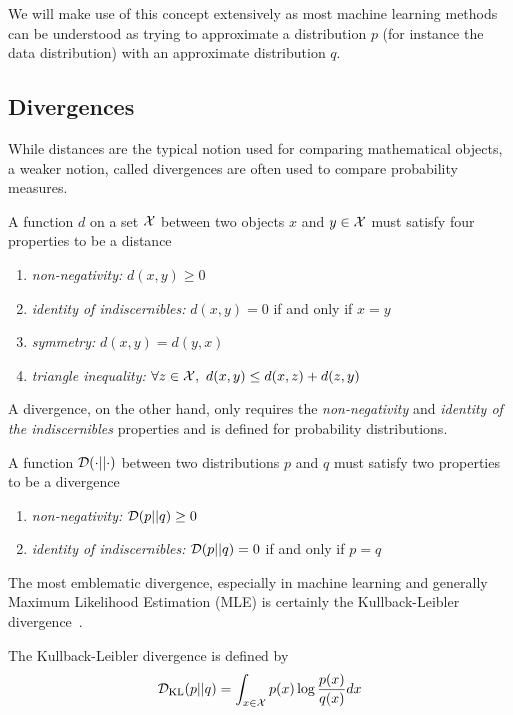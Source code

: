 We will make use of this concept extensively as most machine learning methods can be understood as trying to approximate a distribution $p$ (for instance the data distribution) with an approximate distribution $q$.



\subsection{Divergences}
While distances are the typical notion used for comparing mathematical objects, a weaker notion, called divergences are often used to compare probability measures.



\begin{definition}[Distance]
A function $d$ on a set ${\mathcal{X}}$ between two objects $x$ and $y \in {\mathcal{X}}$ must satisfy four properties to be a distance
\begin{enumerate}
    \item \emph{non-negativity:} $d(x, y) \ge 0$
    \item \emph{identity of indiscernibles:} $d(x,y) = 0$ if and only if $x = y$
    \item \emph{symmetry:} $d(x,y) = d(y,x)$
    \item \emph{triangle inequality:} $\forall z \in {\mathcal{X}}, \ d(x, y) \le d(x,z) + d(z, y) $
\end{enumerate}
\end{definition}

A divergence, on the other hand, only requires the \emph{non-negativity} and \emph{identity of the indiscernibles} properties and is defined for probability distributions.

\begin{definition}[Divergence]
A function ${\mathcal{D}}(\cdot || \cdot)$ between two distributions $p$ and $q$ must satisfy two properties to be a divergence
\begin{enumerate}
    \item \emph{non-negativity:} ${\mathcal{D}}(p||q) \ge 0$
    \item\emph{identity of indiscernibles:} ${\mathcal{D}}(p||q) = 0$ if and only if $p = q$
\end{enumerate}
\end{definition}


The most emblematic divergence, especially in machine learning and generally Maximum Likelihood Estimation (MLE) is certainly the Kullback-Leibler divergence~\citep{kullback1951information, kullback1997information}.
\begin{example} The Kullback-Leibler divergence is defined by
\begin{equation}
\label{eq:kl}
    {\mathcal{D}}_{\mathrm{KL}}(p||q) = \int_{x \in {\mathcal{X}}} p(x) \log \frac{p(x)}{q(x)}  dx
\end{equation}
\end{example}

